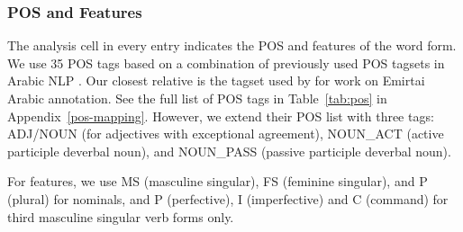 
\subsubsection*{POS and Features}

The analysis cell in every entry indicates the POS and features of the word form. 
We use 35 POS tags based on a combination of previously used POS tagsets in Arabic NLP \citep{Graff:2009:standard,Pasha:2014:madamira,Khalifa:2018:morphologically}.  Our closest relative is the tagset used by \citep{Khalifa:2018:morphologically} for work on Emirtai Arabic annotation. See the full list of POS tags in Table~\ref{tab:pos} in Appendix~\ref{pos-mapping}. %
However, we  extend their POS list with three tags: ADJ/NOUN (for adjectives with exceptional agreement), NOUN\_ACT (active participle deverbal noun), and NOUN\_PASS (passive participle deverbal noun).

For features, we use MS (masculine singular), FS (feminine singular), and P (plural) for nominals, %
and P (perfective), I (imperfective) and C (command) for third masculine singular verb forms only.


